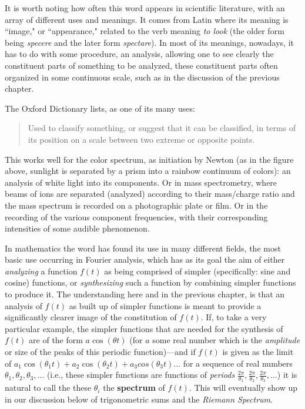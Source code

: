 \documentclass[openany]{book}
\theoremstyle{plain}
\theoremstyle{definition}
\begin{document}
  It is worth noting how often this word appears in scientific literature, with an array of different uses and meanings.   It  comes from Latin where its meaning is ``image," or ``appearance," related to the verb meaning {\it to look} (the older form being  {\it specere} and the later form {\it spectare}).  In most of its meanings, nowadays, it has to do with some procedure, an analysis, allowing one to see clearly the  constituent parts of something to be analyzed, these constituent parts often organized in some continuous scale, such as in the discussion of the previous chapter.

  The Oxford Dictionary lists, as one of its many uses:

\begin{quote} Used to classify something, or suggest that it can be classified, in terms of its position on a scale between two extreme or opposite points.\end{quote}

This works well for the color spectrum, as initiation by Newton (as in the figure above, sunlight is separated by a prism into a rainbow  continuum of colors): an analysis of white light into its components. Or in mass spectrometry, where
 beams of ions are separated (analyzed) according to their
mass/charge ratio and the mass spectrum is recorded on a photographic plate or film.  Or in the recording of the various component frequencies, with their  corresponding intensities of some audible phenomenon.

 In mathematics the word  has found its use in many different fields, the most basic use occurring in Fourier analysis, which has as its goal the aim of either {\it analyzing}  a function $f(t)$ as being  comprised of simpler (specifically: sine and cosine) functions, or {\it synthesizing} such a function by combining simpler functions to produce it. The understanding here and in the previous chapter, is that  an analysis of $f(t)$ as built up of simpler functions is meant to provide a significantly clearer image of the constitution of $f(t)$.  If, to take a very particular example, the simpler functions  that are needed for the synthesis of $f(t)$ are of the form $a\cos(\theta t)$  (for $a$ some real number which is the {\it amplitude} or size of the peaks of this periodic function)---and  if $f(t)$ is given as the limit of $a_1\cos(\theta_1t) +  a_2\cos(\theta_2t) + a_3cos(\theta_3t) \dots$  for a sequence of real numbers $\theta_1, \theta_2,
 \theta_3,
 \dots$  (i.e., these simpler functions are functions of {\it periods} ${\frac{2\pi}{\theta_1}}, {\frac{2\pi}{\theta_2}}, {\frac{2\pi}{\theta_3}}, \dots$) it is natural to call the these $\theta_i$ the  {\bf spectrum} of $f(t)$.
   This will eventually show up in our discussion  below of trigonometric sums and the {\it Riemann Spectrum}.
\end{document}
